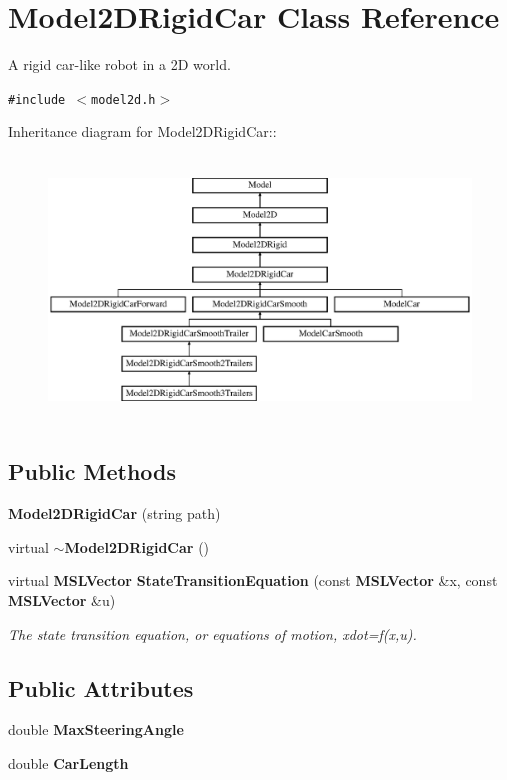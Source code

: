 \section{Model2DRigid\-Car  Class Reference}
\label{classModel2DRigidCar}
A rigid car-like robot in a 2D world. 


{\tt \#include $<$model2d.h$>$}

Inheritance diagram for Model2DRigid\-Car::\begin{figure}[H]
\begin{center}
\leavevmode
\includegraphics[height=7.07741cm]{classModel2DRigidCar}
\end{center}
\end{figure}
\subsection*{Public Methods}
\begin{CompactItemize}
\item 
{\bf Model2DRigid\-Car} (string path)
\item 
virtual {\bf $\sim$Model2DRigid\-Car} ()
\item 
virtual {\bf MSLVector} {\bf State\-Transition\-Equation} (const {\bf MSLVector} \&x, const {\bf MSLVector} \&u)
\begin{CompactList}\small\item\em The state transition equation, or equations of motion, xdot=f(x,u).\item\end{CompactList}\end{CompactItemize}
\subsection*{Public Attributes}
\begin{CompactItemize}
\item 
double {\bf Max\-Steering\-Angle}
\item 
double {\bf Car\-Length}
\end{CompactItemize}


